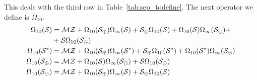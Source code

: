 \documentclass[12pt, a4paper, twoside]{report}
\begin{document}
This deals with the third row in Table~\ref{tab:sep_todefine}. The next operator we define is $\Omega_{10}$. 
\begin{align}
  \begin{aligned}
    \Omega_{10}(\S) %
    &= \M\Z + \Omega_{10}(\S_\oplus)\Omega_\infty(\S) + \S_\oplus\Omega_{10}(\S) + \Omega_{10}(\S)\Omega_\infty(\S_\ominus) +\\
    &+ \S\Omega_{10}(\S_\ominus)\\
    \Omega_{10}(\Sstar) %
    &= \M\Z + \Omega_{10}(\S_\oplus)\Omega_\infty(\Sstar) + \S_\oplus\Omega_{10}(\Sstar) + \Omega_{10}(\Sstar)\Omega_\infty(\S_\ominus)\\
    \Omega_{10}(\S_\oplus) %
    &= \M\Z + \Omega_{10}(\S)\Omega_\infty(\S_\ominus) + \S\Omega_{10}(\S_\ominus)\\
    \Omega_{10}(\S_\ominus)%
    &= \M\Z + \Omega_{10}(\S_\oplus)\Omega_\infty(\S) + \S_\oplus\Omega_{10}(\S) 
  \end{aligned}
\end{align}
\end{document}

